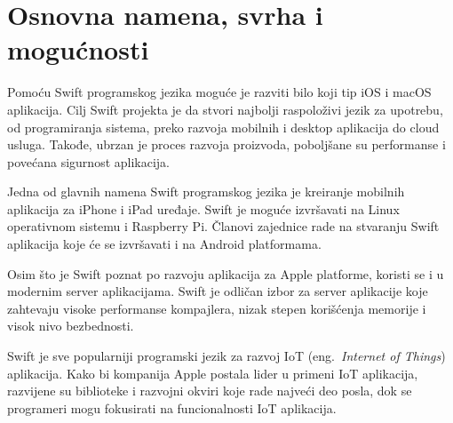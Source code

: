 \documentclass[a4paper]{article}
\begin{document}
\section{Osnovna namena, svrha i mogućnosti}	
\label{sec:drugiDeo}


Pomoću Swift programskog jezika moguće je razviti bilo koji tip iOS i macOS aplikacija. Cilj Swift projekta je da stvori najbolji raspoloživi jezik za upotrebu, od programiranja sistema, preko razvoja mobilnih i desktop aplikacija do cloud usluga. Takođe, ubrzan je proces razvoja proizvoda, poboljšane su performanse i povećana sigurnost aplikacija.

Jedna od glavnih namena Swift programskog jezika je kreiranje mobilnih aplikacija za iPhone i iPad uređaje. Swift je moguće izvršavati na Linux operativnom sistemu i Raspberry Pi. Članovi zajednice rade na stvaranju Swift aplikacija koje će se izvršavati i na Android platformama.

Osim što je Swift poznat po razvoju aplikacija za Apple platforme, koristi se i u modernim server aplikacijama. Swift je odličan izbor za server aplikacije koje zahtevaju visoke performanse kompajlera, nizak stepen korišćenja memorije i visok nivo bezbednosti.

Swift je sve popularniji programski jezik za razvoj IoT (eng.~{\em Internet of Things}) aplikacija. Kako bi kompanija Apple postala lider u primeni IoT aplikacija, razvijene su biblioteke i razvojni okviri koje rade najveći deo posla, dok se programeri mogu fokusirati na funcionalnosti IoT aplikacija.
\end{document}
